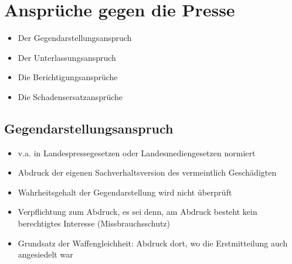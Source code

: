 \chapter{Ansprüche gegen die Presse}
\begin{itemize}
    \item Der Gegendarstellungsanspruch
    \item Der Unterlassungsanspruch
    \item Die Berichtigungsansprüche
    \item Die Schadensersatzansprüche
\end{itemize}
%
%
%
\section{Gegendarstellungsanspruch}
\begin{itemize}
    \item v.a. in Landespressegesetzen oder Landesmediengesetzen normiert
    \item Abdruck der eigenen Sachverhaltsversion des vermeintlich Geschädigten
    \item Wahrheitsgehalt der Gegendarstellung wird nicht überprüft
    \item Verpflichtung zum Abdruck, es sei denn, am Abdruck besteht kein berechtigtes Interesse (Missbrauchsschutz)
    \item Grundsatz der Waffengleichheit: Abdruck dort, wo die Erstmitteilung auch angesiedelt war
\end{itemize}

